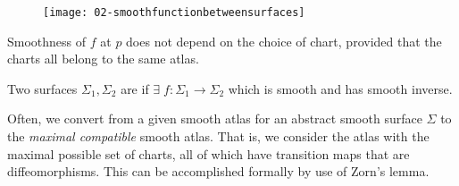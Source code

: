 \begin{figure}[h] 
    \centering 
    \texttt{[image: 02-smoothfunctionbetweensurfaces]} 
\end{figure}

\begin{remark}
	Smoothness of $f$ at $p$ does not depend on the choice of chart, provided that the charts all belong to the same atlas.
\end{remark} 

\begin{definition}
	Two surfaces $\Sigma_1, \Sigma_2$ are  if $\exists \; f \colon \Sigma_1 \to \Sigma_2$ which is smooth and has smooth inverse.
\end{definition}

\begin{remark}
	Often, we convert from a given smooth atlas for an abstract smooth surface $\Sigma$ to the \textit{maximal compatible} smooth atlas.
	That is, we consider the atlas with the maximal possible set of charts, all of which have transition maps that are diffeomorphisms.
	This can be accomplished formally by use of Zorn's lemma.
\end{remark}
